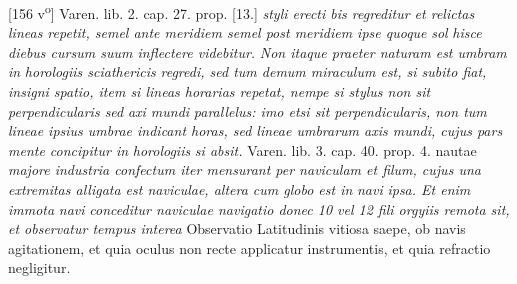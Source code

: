                 \vspace*{8mm}
                \pstart 
                \normalsize
            [156 v\textsuperscript{o}] Varen. lib. 2. cap. 27. prop. [13.]\pend \pstart {}\textit{ styli erecti bis regreditur et relictas lineas repetit, semel ante meridiem semel post meridiem  ipse quoque }\textit{sol}\protect{}\textit{ hisce diebus cursum suum inflectere videbitur.} \textit{}\textit{ Non itaque  praeter naturam est umbram in }\textit{horologiis sciathericis}\protect{}\textit{ regredi, sed tum demum  miraculum est, si subito fiat, insigni spatio, item si lineas horarias repetat, nempe si stylus non sit perpendicularis sed }\textit{axi mundi}\protect{}\textit{ parallelus: imo etsi sit  perpendicularis, non tum lineae ipsius umbrae indicant horas, sed lineae umbrarum axis mundi, cujus pars mente concipitur in }\textit{horologiis}\protect{}\textit{ si absit.} \pend \pstart  Varen. lib. 3. cap. 40. prop. 4. nautae \textit{majore industria confectum  iter mensurant per naviculam et filum, cujus una extremitas alligata  est naviculae, altera cum globo est in }\textit{navi}\protect{}\textit{ ipsa. Et enim immota }\textit{navi}\protect{}\textit{ conceditur naviculae navigatio donec 10 vel 12 fili orgyiis remota sit, et observatur tempus interea} \pend \pstart Observatio Latitudinis\protect{} vitiosa saepe, ob navis\protect{} agitationem, et quia oculus non  recte applicatur instrumentis, et quia refractio\protect{} negligitur. \pend 